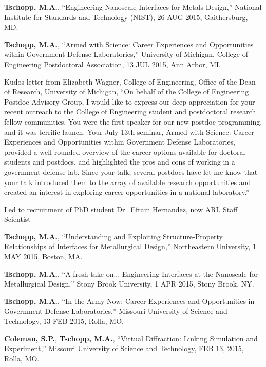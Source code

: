 \begin{cvlist}
\item
\textbf{Tschopp, M.A.}, ``Engineering Nanoscale Interfaces for Metals Design,'' National Institute for Standards and Technology (NIST), 26 AUG 2015, Gaithersburg, MD.

\item
\textbf{Tschopp, M.A.}, ``Armed with Science: Career Experiences and Opportunities within Government Defense Laboratories,'' University of Michigan, College of Engineering Postdoctoral Association, 13 JUL 2015, Ann Arbor, MI.
\begin{list2}
\item[$\star$] Kudos letter from Elizabeth Wagner, College of Engineering, Office of the Dean of Research, University of Michigan, ``On behalf of the College of Engineering Postdoc Advisory Group, I would like to express our deep appreciation for your recent outreach to the College of Engineering student and postdoctoral research fellow communities. You were the first speaker for our new postdoc programming, and it was terrific launch. Your July 13th seminar, Armed with Science: Career Experiences and Opportunities within Government Defense Laboratories, provided a well-rounded overview of the career options available for doctoral students and postdocs, and highlighted the pros and cons of working in a government defense lab. Since your talk, several postdocs have let me know that your talk introduced them to the array of available research opportunities and created an interest in exploring career opportunities in a national laboratory.''
\item[$\star$] Led to recruitment of PhD student Dr.~Efrain Hernandez, now ARL Staff Scientist
\end{list2}

\item
\textbf{Tschopp, M.A.}, ``Understanding and Exploiting Structure-Property Relationships of Interfaces for Metallurgical Design,'' Northeastern University, 1 MAY 2015, Boston, MA.

\item
\textbf{Tschopp, M.A.}, ``A fresh take on... Engineering Interfaces at the Nanoscale for Metallurgical Design,'' Stony Brook University, 1 APR 2015, Stony Brook, NY.

\item
\textbf{Tschopp, M.A.}, ``In the Army Now: Career Experiences and Opportunities in Government Defense Laboratories,'' Missouri University of Science and Technology, 13 FEB 2015, Rolla, MO.

\item
{\textbf{Coleman, S.P.}}, \textbf{Tschopp, M.A.}, ``Virtual Diffraction: Linking Simulation and Experiment,'' Missouri University of Science and Technology, FEB 13, 2015, Rolla, MO.


\end{cvlist}
